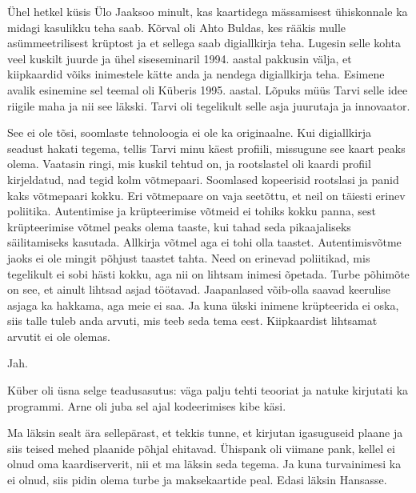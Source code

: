 Ühel hetkel küsis Ülo Jaaksoo minult, kas
kaartidega mässamisest ühiskonnale ka midagi kasulikku teha saab. Kõrval 
oli Ahto Buldas, kes rääkis mulle asümmeetrilisest 
krüptost ja et sellega saab digiallkirja teha. Lugesin selle kohta veel 
kuskilt juurde ja ühel siseseminaril 1994. aastal pakkusin välja, et 
kiipkaardid võiks inimestele kätte anda ja nendega digiallkirja teha. 
Esimene avalik esinemine sel teemal oli Küberis 1995. aastal. Lõpuks müüs
Tarvi selle idee
riigile maha ja nii see läkski. Tarvi oli tegelikult selle asja juurutaja 
ja innovaator.


See ei ole tõsi, soomlaste tehnoloogia ei ole ka originaalne. Kui 
digiallkirja seadust hakati tegema, tellis Tarvi minu käest profiili, missugune 
see kaart peaks olema. Vaatasin ringi, mis kuskil tehtud on, ja rootslastel oli 
kaardi profiil kirjeldatud, nad tegid kolm võtmepaari. Soomlased kopeerisid 
rootslasi ja panid kaks võtmepaari kokku. Eri võtmepaare on vaja 
seetõttu, et neil on täiesti erinev poliitika. Autentimise ja 
krüpteerimise võtmeid ei tohiks kokku panna, sest krüpteerimise võtmel peaks 
olema taaste, kui tahad seda pikaajaliseks säilitamiseks kasutada. Allkirja 
võtmel aga ei tohi olla taastet. 
Autentimisvõtme jaoks ei ole mingit põhjust taastet tahta. Need on erinevad 
poliitikad, mis tegelikult ei sobi hästi kokku, aga nii on lihtsam inimesi 
õpetada. Turbe põhimõte on see, et ainult lihtsad asjad töötavad. 
Jaapanlased võib-olla saavad keerulise asjaga ka hakkama, aga meie ei saa. Ja 
kuna ükski inimene krüpteerida ei oska, siis talle tuleb anda arvuti, mis teeb
seda tema eest. Kiipkaardist lihtsamat arvutit ei ole olemas.


Jah.


Küber oli üsna selge teadusasutus: väga palju 
tehti teooriat ja natuke kirjutati ka programmi. Arne oli juba sel ajal kodeerimises kibe käsi.

Ma läksin sealt ära sellepärast, et tekkis tunne, et kirjutan 
igasuguseid plaane ja siis teised mehed plaanide põhjal ehitavad. 
Ühispank oli viimane pank, kellel ei olnud oma 
kaardiserverit, nii et ma läksin seda 
tegema. Ja kuna turvainimesi ka ei olnud, siis pidin olema turbe ja 
maksekaartide peal. Edasi läksin Hansasse. 

